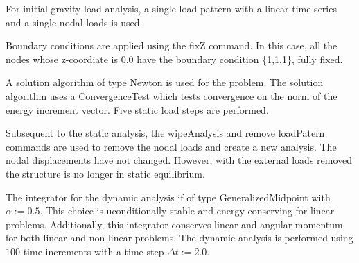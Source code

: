 \documentclass[12pt]{article}
\begin{document}
For initial gravity load analysis, a single load pattern 
with a linear time series and a single nodal loads is used. 

Boundary conditions are applied using the fixZ command.  In this case, 
all the nodes whose z-coordiate is $0.0$ have the boundary condition
\{1,1,1\}, fully fixed.

\vspace{0.2in}

A solution algorithm of type Newton is used for the 
problem. The solution algorithm uses a ConvergenceTest which tests
convergence on the norm of the energy increment vector. 
Five static load steps are performed.

Subsequent to the static analysis, the wipeAnalysis and 
remove loadPatern commands are used 
to remove the nodal loads and create a new analysis.  The nodal 
displacements have not changed.  However, with the external loads removed
the structure is no longer in static equilibrium.

The integrator for the dynamic analysis if of type 
GeneralizedMidpoint with $\alpha := 0.5$.  This choice 
is uconditionally stable and energy conserving for linear problems.
Additionally, this integrator conserves linear and
angular momentum for both linear and non-linear problems.
The dynamic analysis is performed using $100$ time increments with
a time step $\Delta t := 2.0$.
\end{document}
